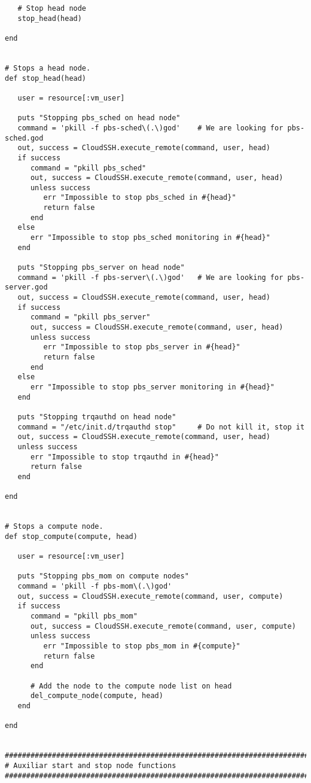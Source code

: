 \begin{lstlisting}
   # Stop head node
   stop_head(head)
   
end


# Stops a head node.
def stop_head(head)
   
   user = resource[:vm_user]
   
   puts "Stopping pbs_sched on head node"
   command = 'pkill -f pbs-sched\(.\)god'    # We are looking for pbs-sched.god
   out, success = CloudSSH.execute_remote(command, user, head)
   if success
      command = "pkill pbs_sched"
      out, success = CloudSSH.execute_remote(command, user, head)
      unless success
         err "Impossible to stop pbs_sched in #{head}"
         return false
      end
   else
      err "Impossible to stop pbs_sched monitoring in #{head}"
   end
   
   puts "Stopping pbs_server on head node"
   command = 'pkill -f pbs-server\(.\)god'   # We are looking for pbs-server.god
   out, success = CloudSSH.execute_remote(command, user, head)
   if success
      command = "pkill pbs_server"
      out, success = CloudSSH.execute_remote(command, user, head)
      unless success
         err "Impossible to stop pbs_server in #{head}"
         return false
      end
   else
      err "Impossible to stop pbs_server monitoring in #{head}"
   end
   
   puts "Stopping trqauthd on head node"
   command = "/etc/init.d/trqauthd stop"     # Do not kill it, stop it
   out, success = CloudSSH.execute_remote(command, user, head)
   unless success
      err "Impossible to stop trqauthd in #{head}"
      return false
   end

end


# Stops a compute node.
def stop_compute(compute, head)

   user = resource[:vm_user]

   puts "Stopping pbs_mom on compute nodes"
   command = 'pkill -f pbs-mom\(.\)god'
   out, success = CloudSSH.execute_remote(command, user, compute)
   if success
      command = "pkill pbs_mom"
      out, success = CloudSSH.execute_remote(command, user, compute)
      unless success
         err "Impossible to stop pbs_mom in #{compute}"
         return false
      end
      
      # Add the node to the compute node list on head
      del_compute_node(compute, head)
   end

end


################################################################################
# Auxiliar start and stop node functions
################################################################################


\end{lstlisting}

